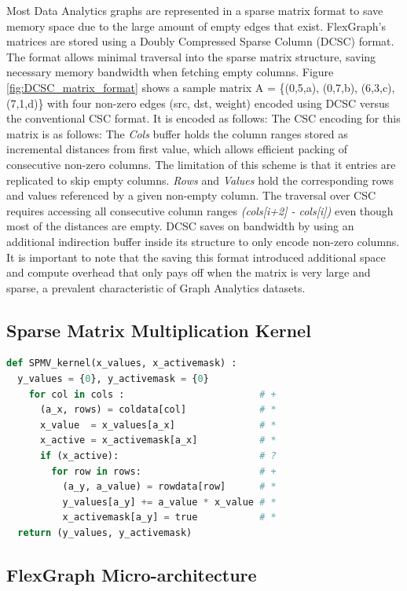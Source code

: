 Most Data Analytics graphs are represented in a sparse matrix format to save memory space due to the large amount of empty edges that exist. FlexGraph's matrices are stored using a Doubly Compressed Sparse Column (DCSC) \cite{DCSC} format. The format allows minimal traversal into the sparse matrix structure, saving necessary memory bandwidth when fetching empty columns. Figure \ref{fig:DCSC_matrix_format} shows a sample matrix A = \{(0,5,a), (0,7,b), (6,3,c), (7,1,d)\} with four non-zero edges (src, dst, weight) encoded using DCSC versus the conventional CSC \cite{CSC} format. It is encoded as follows: The CSC encoding for this matrix is as follows: The \textit{Cols} buffer holds the column ranges stored as incremental distances from first value, which allows efficient packing of consecutive non-zero columns. The limitation of this scheme is that it entries are replicated to skip empty columns. \textit{Rows} and \textit{Values} hold the corresponding rows and values referenced by a given non-empty column.
The traversal over CSC requires accessing all consecutive column ranges \textit{(cols[i+2] - cols[i])} even though most of the distances are empty. DCSC saves on bandwidth by using an additional indirection  buffer inside its structure to only encode non-zero columns. It is important to note that the saving this format introduced additional space and compute overhead that only pays off when the matrix is very large and sparse, a prevalent characteristic of Graph Analytics datasets.

\subsection{Sparse Matrix Multiplication Kernel}

\begin{lstlisting}[language=Python, caption=Pseudocode for SPMV kernel]
def SPMV_kernel(x_values, x_activemask) :
  y_values = {0}, y_activemask = {0}
    for col in cols :                        # +	
      (a_x, rows) = coldata[col]             # *
      x_value  = x_values[a_x]               # *
      x_active = x_activemask[a_x]           # *
      if (x_active):                         # ?
        for row in rows:                     # +
          (a_y, a_value) = rowdata[row]      # *
          y_values[a_y] += a_value * x_value # *
          x_activemask[a_y] = true           # *
  return (y_values, y_activemask)
\end{lstlisting}

\subsection{FlexGraph Micro-architecture}

